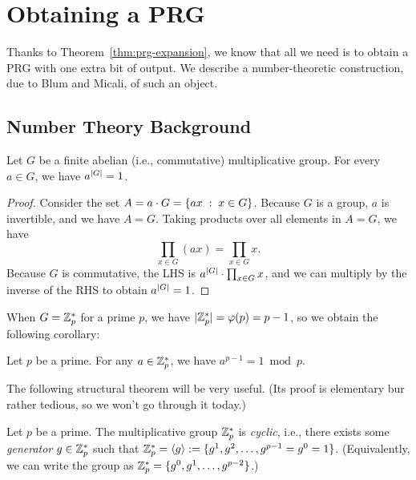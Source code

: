 \documentclass[11pt]{article}
\begin{document}
\section{Obtaining a PRG}
\label{sec:obtaining-prg}

Thanks to Theorem~\ref{thm:prg-expansion}, we know that all we need is
to obtain a PRG with one extra bit of output.  We describe a
number-theoretic construction, due to Blum and Micali, of such an
object.

\subsection{Number Theory Background}
\label{sec:background}

\begin{theorem}
  \label{thm:euler-thm}
  Let $G$ be a finite abelian (i.e., commutative) multiplicative
  group.  For every $a \in G$, we have $a^{\lvert G\rvert} = 1$.
\end{theorem}

\begin{proof}
  Consider the set $A = a \cdot G = \{ ax\; :\; x \in G\}$.  Because
  $G$ is a group, $a$ is invertible, and we have $A = G$.  Taking
  products over all elements in $A = G$, we have \[ \prod_{x \in G}
  (ax) = \prod_{x \in G} x. \] Because $G$ is commutative, the LHS is
  $a^{\lvert G\rvert} \cdot \prod_{x \in G} x$, and we can multiply by the
  inverse of the RHS to obtain $a^{\lvert G\rvert} = 1$.
\end{proof}


When $G = \mathbb{Z}_p^{*}$ for a prime $p$, we have $\lvert\mathbb{Z}_p^{*}\rvert =
\varphi(p) = p-1$, so we obtain the following corollary:

\begin{corollary}
  Let $p$ be a prime.  For any $a \in \mathbb{Z}_p^{*}$, we have $a^{p-1} = 1
  \bmod p$.
\end{corollary}

The following structural theorem will be very useful.  (Its proof is
elementary bur rather tedious, so we won't go through it today.)

\begin{theorem}
  \label{thm:Zps-cyclic}
  Let $p$ be a prime.  The multiplicative group $\mathbb{Z}_p^{*}$ is
  \emph{cyclic}, i.e., there exists some \emph{generator}
  $g \in \mathbb{Z}_p^{*}$ such that
  $\mathbb{Z}_p^{*} = \langle g \rangle := \{g^{1}, g^{2}, \ldots,
    g^{p-1}=g^{0}=1\}$. (Equivalently, we can write the group as
  $\mathbb{Z}_p^{*} = \{g^{0}, g^{1}, \ldots, g^{p-2}\}$.)
\end{theorem}
\end{document}
